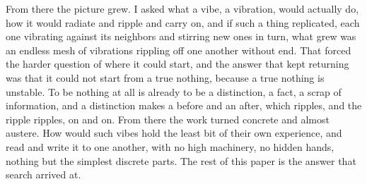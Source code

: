 From there the picture grew. I asked what a vibe, a vibration, would actually do, how it would radiate and ripple and carry on, and if such a thing replicated, each one vibrating against its neighbors and stirring new ones in turn, what grew was an endless mesh of vibrations rippling off one another without end. That forced the harder question of where it could start, and the answer that kept returning was that it could not start from a true nothing, because a true nothing is unstable. To be nothing at all is already to be a distinction, a fact, a scrap of information, and a distinction makes a before and an after, which ripples, and the ripple ripples, on and on. From there the work turned concrete and almost austere. How would such vibes hold the least bit of their own experience, and read and write it to one another, with no high machinery, no hidden hands, nothing but the simplest discrete parts. The rest of this paper is the answer that search arrived at.
